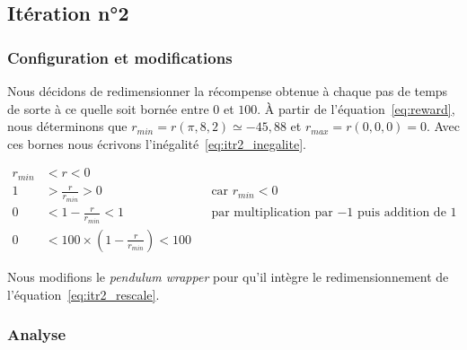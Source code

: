 \subsection{Itération n°2}

\subsubsection{Configuration et modifications}
 
 Nous décidons de redimensionner la récompense obtenue à chaque pas de temps de sorte à ce quelle soit bornée entre $0$ et $100$. À partir de l'équation~\eqref{eq:reward}, nous déterminons que $r_{min} = r(\pi, 8, 2) \simeq -45,88$ et $r_{max} = r(0, 0, 0) = 0$. Avec ces bornes nous écrivons l'inégalité~\eqref{eq:itr2_inegalite}.
 
\begin{align}
    r_{min} &< r < 0 \label{eq:itr2_inegalite} \\
    1 &> \frac{r}{r_{min}} > 0 &&\text{car $r_{min}<0$}\\
    0 &< 1 - \frac{r}{r_{min}} < 1 &&\text{par multiplication par $-1$ puis addition de $1$}\\
    0 &< 100 \times \left( 1 - \frac{r}{r_{min}} \right) < 100 \label{eq:itr2_rescale}
\end{align}
 
Nous modifions le \emph{pendulum wrapper} pour qu'il intègre le redimensionnement de l'équation~\eqref{eq:itr2_rescale}.

\subsubsection{Analyse}

